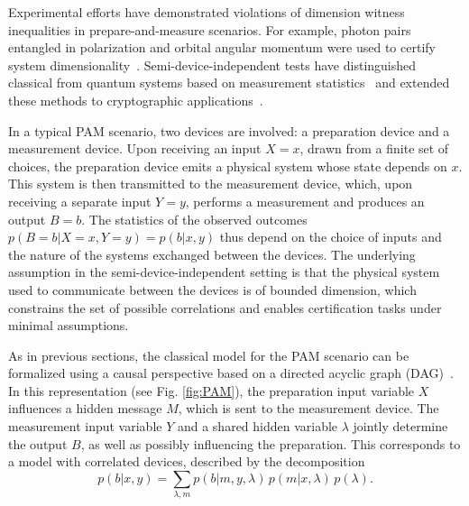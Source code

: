 \documentclass[aps,pra,reprint, superscriptaddress,showkeys]{revtex4-2}
\theoremstyle{plain}
\begin{document}
Experimental efforts have demonstrated violations of dimension witness inequalities in prepare-and-measure scenarios. For example, photon pairs entangled in polarization and orbital angular momentum were used to certify system dimensionality~\cite{hendrych2012}. Semi-device-independent tests have distinguished classical from quantum systems based on measurement statistics~\cite{ahrens2012} and extended these methods to cryptographic applications~\cite{ahrens2014}. 

In a typical PAM scenario, two devices are involved: a preparation device and a measurement device. Upon receiving an input \(X=x\), drawn from a finite set of choices, the preparation device emits a physical system whose state depends on \(x\). This system is then transmitted to the measurement device, which, upon receiving a separate input \(Y=y\), performs a measurement and produces an output \(B=b\). The statistics of the observed outcomes \(p(B=b|X=x,Y=y) = p(b|x,y)\) thus depend on the choice of inputs and the nature of the systems exchanged between the devices. The underlying assumption in the semi-device-independent setting is that the physical system used to communicate between the devices is of bounded dimension, which constrains the set of possible correlations and enables certification tasks under minimal assumptions.

As in previous sections, the classical model for the PAM scenario can be formalized using a causal perspective based on a directed acyclic graph (DAG)~\cite{davide2020}. In this representation (see Fig. \ref{fig:PAM}), the preparation input variable \(X\) influences a hidden message \(M\), which is sent to the measurement device. The measurement input variable \(Y\) and a shared hidden variable \(\lambda\) jointly determine the output \(B\), as well as possibly influencing the preparation. This corresponds to a model with correlated devices, described by the decomposition
\begin{equation}
p(b|x,y) = \sum_{\lambda, m} p(b|m, y, \lambda) \, p(m|x, \lambda) \, p(\lambda).
\label{eq: pam_classical}
\end{equation}
\end{document}
